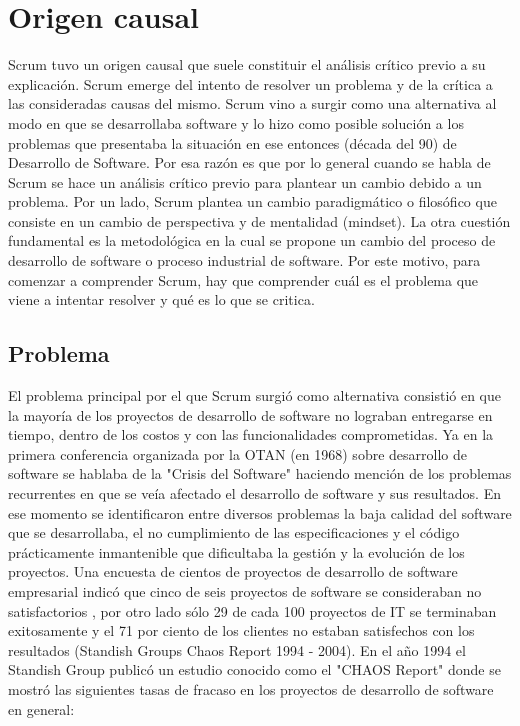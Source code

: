 \section{Origen causal}

Scrum tuvo un origen causal que suele constituir el análisis crítico previo a su explicación. Scrum emerge del intento de resolver un problema y de la crítica a las consideradas causas del mismo. Scrum vino a surgir como una alternativa al modo en que se desarrollaba software y lo hizo como posible solución a los problemas que presentaba la situación en ese entonces (década del 90) de Desarrollo de Software. Por esa razón es que por lo general cuando se habla de Scrum se hace un análisis crítico previo para plantear un cambio debido a un problema. Por un lado, Scrum plantea un cambio paradigmático o filosófico que consiste en un cambio de perspectiva y de mentalidad (mindset). La otra cuestión fundamental es la metodológica en la cual se propone un cambio del proceso de desarrollo de software o proceso industrial de software. Por este motivo, para comenzar a comprender Scrum, hay que comprender cuál es el problema que viene a intentar resolver y qué es lo que se critica.

\subsection{Problema}

El problema principal por el que Scrum surgió como alternativa consistió en que la mayoría de los proyectos de desarrollo de software no lograban entregarse en tiempo, dentro de los costos y con las funcionalidades comprometidas. Ya en la primera conferencia organizada por la OTAN (en 1968) sobre desarrollo de software se hablaba de la "Crisis del Software" haciendo mención de los problemas recurrentes en que se veía afectado el desarrollo de software y sus resultados. En ese momento se identificaron entre diversos problemas la baja calidad del software que se desarrollaba, el no cumplimiento de las especificaciones y el código prácticamente inmantenible que dificultaba la gestión y la evolución de los proyectos. Una encuesta de cientos de proyectos de desarrollo de software empresarial indicó que cinco de seis proyectos de software se consideraban no satisfactorios \cite{AntiPatterns-1998}, por otro lado sólo 29 de cada 100 proyectos de IT se terminaban exitosamente y el 71 por ciento de los clientes no estaban satisfechos con los resultados (Standish Groups Chaos Report 1994 - 2004). En el año 1994 el Standish Group publicó un estudio conocido como el "CHAOS Report" \cite{CHAOS-Report-1994} donde se mostró las siguientes tasas de fracaso en los proyectos de desarrollo de software en general:


